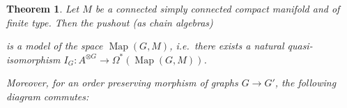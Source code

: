 \documentclass{scrartcl}
\theoremstyle{plain}
\newtheorem{theorem}{Theorem}[section]
\theoremstyle{definition}
\DeclareMathOperator{\Map}{Map}
\begin{document}
\begin{theorem}\label{thm:graph-mapping-space}
    Let $M$ be a connected simply connected compact manifold and of finite type. Then the pushout (as chain algebras)
    \begin{center}
    \end{center}
    is a model of the space $\Map(G, M)$, i.e.\ there exists a natural quasi-isomorphism
    $I_G\colon A^{\otimes G} \to \Omega^*(\Map(G, M))$.
    
    Moreover, for an order preserving morphism of graphs $G\to G'$, the following diagram commutes:
    \begin{center}
    \end{center}
\end{theorem}
\end{document}
